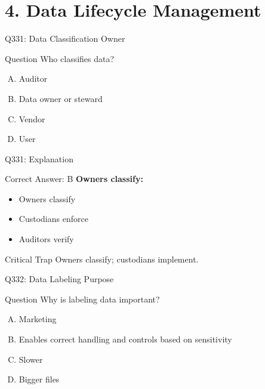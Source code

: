 \documentclass{beamer}
\begin{document}
	\section{4. Data Lifecycle Management}
	
	\begin{frame}{Q331: Data Classification Owner}
		\begin{block}{Question}
			Who classifies data?
		\end{block}
		\begin{enumerate}[(A)]
			\item Auditor
			\item Data owner or steward
			\item Vendor
			\item User
		\end{enumerate}
	\end{frame}
	
	\begin{frame}{Q331: Explanation}
		\begin{block}{Correct Answer: B}
			\textbf{Owners classify:}
			\begin{itemize}
				\item Owners classify
				\item Custodians enforce
				\item Auditors verify
			\end{itemize}
		\end{block}
		\begin{alertblock}{Critical Trap}
			Owners classify; custodians implement.
		\end{alertblock}
	\end{frame}
	
	\begin{frame}{Q332: Data Labeling Purpose}
		\begin{block}{Question}
			Why is labeling data important?
		\end{block}
		\begin{enumerate}[(A)]
			\item Marketing
			\item Enables correct handling and controls based on sensitivity
			\item Slower
			\item Bigger files
		\end{enumerate}
	\end{frame}
	
\end{document}
